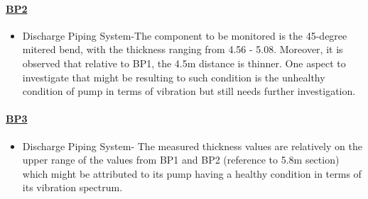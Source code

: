 \paragraph{\underline{BP2}}
\begin{itemize}

\item Discharge Piping System-The component to be monitored is the 45-degree mitered bend, with the thickness ranging from 4.56 - 5.08. Moreover, it is observed that relative to BP1, the 4.5m distance is thinner. One aspect to investigate that might be resulting to such condition is the unhealthy condition of pump in terms of vibration but still needs further investigation.

\end{itemize}

\paragraph{\underline{BP3}}
\begin{itemize}
	\item Discharge Piping System- The measured thickness values are relatively on the upper range of the values from BP1 and BP2 (reference to 5.8m section) which might be attributed to its pump having a healthy condition in terms of its vibration spectrum. 
	
\end{itemize}

